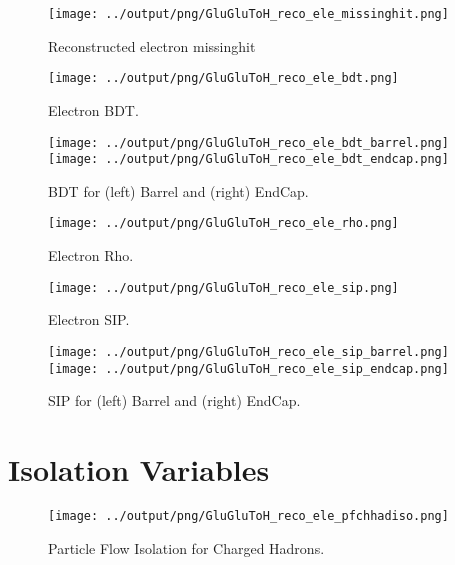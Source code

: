 \documentclass[11pt]{book}
\begin{document}
\begin{figure}[ht]
\centering
\texttt{[image: ../output/png/GluGluToH\_reco\_ele\_missinghit.png]}
\caption{Reconstructed electron missinghit}
\label{fig:gluglu_reco_ele_missinghit}
\end{figure}

\begin{figure}[ht]
\centering
\texttt{[image: ../output/png/GluGluToH\_reco\_ele\_bdt.png]}
\caption{Electron BDT.}
\label{fig:gluglu_reco_ele_bdt}
\end{figure}

\begin{figure}[ht]
\centering
\texttt{[image: ../output/png/GluGluToH\_reco\_ele\_bdt\_barrel.png]}
\texttt{[image: ../output/png/GluGluToH\_reco\_ele\_bdt\_endcap.png]}
\caption{BDT for (left) Barrel and (right) EndCap.}
\label{fig:gluglu_reco_ele_bdt_regions}
\end{figure}

\begin{figure}[ht]
\centering
\texttt{[image: ../output/png/GluGluToH\_reco\_ele\_rho.png]}
\caption{Electron Rho.}
\label{fig:gluglu_reco_ele_rho}
\end{figure}

\begin{figure}[ht]
\centering
\texttt{[image: ../output/png/GluGluToH\_reco\_ele\_sip.png]}
\caption{Electron SIP.}
\label{fig:gluglu_reco_ele_sip}
\end{figure}

\begin{figure}[ht]
\centering
\texttt{[image: ../output/png/GluGluToH\_reco\_ele\_sip\_barrel.png]}
\texttt{[image: ../output/png/GluGluToH\_reco\_ele\_sip\_endcap.png]}
\caption{SIP for (left) Barrel and (right) EndCap.}
\label{fig:gluglu_reco_ele_sip_regions}
\end{figure}
\clearpage

\section{Isolation Variables}

\begin{figure}[ht]
\centering
\texttt{[image: ../output/png/GluGluToH\_reco\_ele\_pfchhadiso.png]}
\caption{Particle Flow Isolation for Charged Hadrons.}
\label{fig:gluglu_reco_ele_pfchhadiso}
\end{figure}
\end{document}
